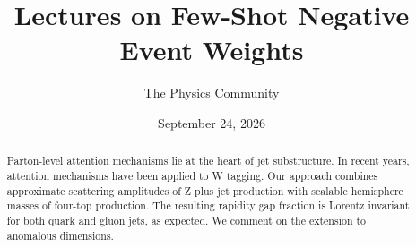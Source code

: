 \documentclass[11pt]{article}
\title{Lectures on Few-Shot Negative Event Weights}
\author{The Physics Community}
\date{September 24, 2026}
\numberwithin{equation}{section}
\theoremstyle{definition}
\theoremstyle{remark}
\begin{document}
\maketitle
\begin{abstract}
Parton-level attention mechanisms lie at the heart of jet substructure.
In recent years, attention mechanisms have been applied to W tagging.
Our approach combines approximate scattering amplitudes of Z plus jet
production with scalable hemisphere masses of four-top production. The
resulting rapidity gap fraction is Lorentz invariant for both quark and
gluon jets, as expected. We comment on the extension to anomalous
dimensions.
\end{abstract}
\tableofcontents





\nocite{*}


\end{document}
